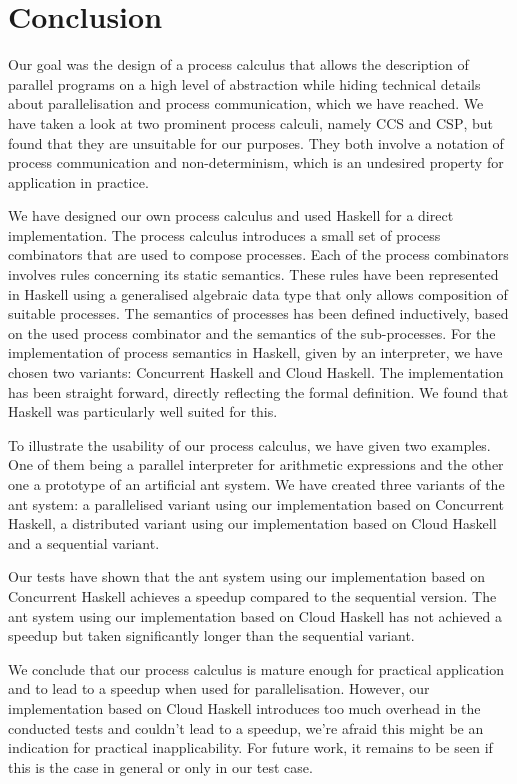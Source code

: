 \chapter{Conclusion}
\vspace*{-0.5em}
Our goal was the design of a process calculus that allows the description of parallel programs on a high level of abstraction while hiding technical details about parallelisation and process communication, which we have reached. We have taken a look at two prominent process calculi, namely \textsc{CCS} and \textsc{CSP}, but found that they are unsuitable for our purposes. They both involve a notation of process communication and non-determinism, which is an undesired property for application in practice.

\vspace*{-0.25em}
We have designed our own process calculus and used \textsf{Haskell} for a direct implementation. The process calculus introduces a small set of process combinators that are used to compose processes. Each of the process combinators involves rules concerning its static semantics. These rules have been represented in \textsf{Haskell} using a generalised algebraic data type that only allows composition of suitable processes. The semantics of processes has been defined inductively, based on the used process combinator and the semantics of the sub-processes. For the implementation of process semantics in \textsf{Haskell}, given by an interpreter, we have chosen two variants: \textsf{Concurrent Haskell} and \textsf{Cloud Haskell}. The implementation has been straight forward, directly reflecting the formal definition. We found that \textsf{Haskell} was particularly well suited for this.

\vspace*{-0.25em}
To illustrate the usability of our process calculus, we have given two examples. One of them being a parallel interpreter for arithmetic expressions and the other one a prototype of an artificial ant system. We have created three variants of the ant system: a parallelised variant using our implementation based on \textsf{Concurrent Haskell}, a distributed variant using our implementation based on \textsf{Cloud Haskell} and a sequential variant.

\vspace*{-0.25em}
Our tests have shown that the ant system using our implementation based on \textsf{Concurrent Haskell} achieves a speedup compared to the sequential version. The ant system using our implementation based on \textsf{Cloud Haskell} has not achieved a speedup but taken significantly longer than the sequential variant. 

\vspace*{-0.25em}
We conclude that our process calculus is mature enough for practical application and to lead to a speedup when used for parallelisation. However, our implementation based on \textsf{Cloud Haskell} introduces too much overhead in the conducted tests and couldn't lead to a speedup, we're afraid this might be an indication for practical inapplicability. For future work, it remains to be seen if this is the case in general or only in our test case.
\vspace*{-0.5em}